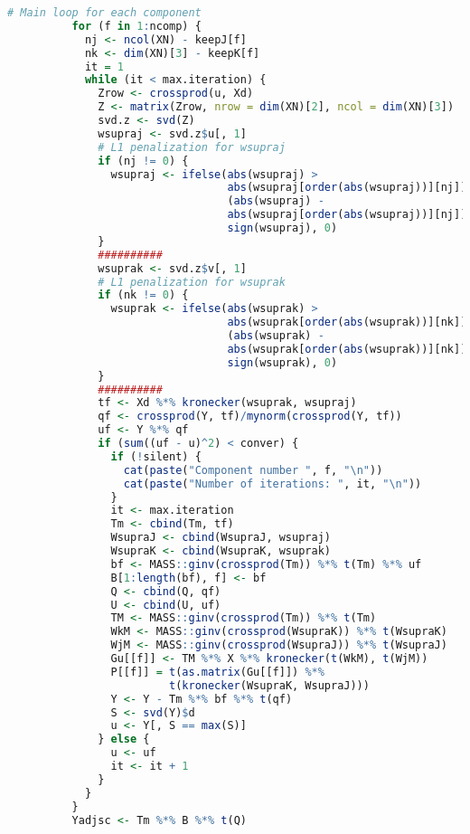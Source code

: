 \begin{scriptsize}
\begin{lstlisting}[language=R, deletekeywords={scale, !=, <-, !, Q, qf, names, max, var}, otherkeywords={}, morekeywords={unfold3w}, caption=sNPLS main function]
          # Main loop for each component
          for (f in 1:ncomp) {
            nj <- ncol(XN) - keepJ[f]
            nk <- dim(XN)[3] - keepK[f]
            it = 1
            while (it < max.iteration) {
              Zrow <- crossprod(u, Xd)
              Z <- matrix(Zrow, nrow = dim(XN)[2], ncol = dim(XN)[3])
              svd.z <- svd(Z)
              wsupraj <- svd.z$u[, 1]
              # L1 penalization for wsupraj
              if (nj != 0) {
                wsupraj <- ifelse(abs(wsupraj) > 
                                  abs(wsupraj[order(abs(wsupraj))][nj]),
                                  (abs(wsupraj) - 
                                  abs(wsupraj[order(abs(wsupraj))][nj])) *
                                  sign(wsupraj), 0)
              }
              ##########
              wsuprak <- svd.z$v[, 1]
              # L1 penalization for wsuprak
              if (nk != 0) {
                wsuprak <- ifelse(abs(wsuprak) > 
                                  abs(wsuprak[order(abs(wsuprak))][nk]),
                                  (abs(wsuprak) - 
                                  abs(wsuprak[order(abs(wsuprak))][nk])) *
                                  sign(wsuprak), 0)
              }
              ##########
              tf <- Xd %*% kronecker(wsuprak, wsupraj)
              qf <- crossprod(Y, tf)/mynorm(crossprod(Y, tf))
              uf <- Y %*% qf
              if (sum((uf - u)^2) < conver) {
                if (!silent) {
                  cat(paste("Component number ", f, "\n"))
                  cat(paste("Number of iterations: ", it, "\n"))
                }
                it <- max.iteration
                Tm <- cbind(Tm, tf)
                WsupraJ <- cbind(WsupraJ, wsupraj)
                WsupraK <- cbind(WsupraK, wsuprak)
                bf <- MASS::ginv(crossprod(Tm)) %*% t(Tm) %*% uf
                B[1:length(bf), f] <- bf
                Q <- cbind(Q, qf)
                U <- cbind(U, uf)
                TM <- MASS::ginv(crossprod(Tm)) %*% t(Tm)
                WkM <- MASS::ginv(crossprod(WsupraK)) %*% t(WsupraK)
                WjM <- MASS::ginv(crossprod(WsupraJ)) %*% t(WsupraJ)
                Gu[[f]] <- TM %*% X %*% kronecker(t(WkM), t(WjM))
                P[[f]] = t(as.matrix(Gu[[f]]) %*% 
                         t(kronecker(WsupraK, WsupraJ)))
                Y <- Y - Tm %*% bf %*% t(qf)
                S <- svd(Y)$d
                u <- Y[, S == max(S)]
              } else {
                u <- uf
                it <- it + 1
              }
            }
          }
          Yadjsc <- Tm %*% B %*% t(Q)

\end{lstlisting}
\end{scriptsize}

